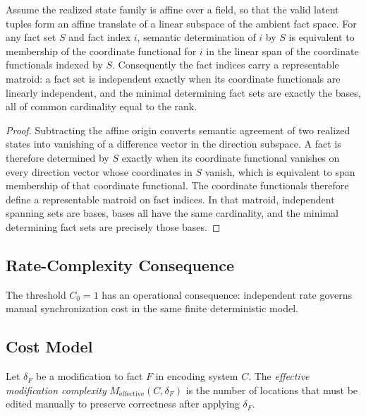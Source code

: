 \begin{theorem}\label{thm:affine-fact-matroid}
Assume the realized state family is affine over a field, so that the valid latent tuples form an affine translate of a linear subspace of the ambient fact space. For any fact set $S$ and fact index $i$, semantic determination of $i$ by $S$ is equivalent to membership of the coordinate functional for $i$ in the linear span of the coordinate functionals indexed by $S$. Consequently the fact indices carry a representable matroid: a fact set is independent exactly when its coordinate functionals are linearly independent, and the minimal determining fact sets are exactly the bases, all of common cardinality equal to the rank.
\end{theorem}

\begin{proof}
Subtracting the affine origin converts semantic agreement of two realized states into vanishing of a difference vector in the direction subspace. A fact is therefore determined by $S$ exactly when its coordinate functional vanishes on every direction vector whose coordinates in $S$ vanish, which is equivalent to span membership of that coordinate functional. The coordinate functionals therefore define a representable matroid on fact indices. In that matroid, independent spanning sets are bases, bases all have the same cardinality, and the minimal determining fact sets are precisely those bases.
\end{proof}

\subsection{Rate-Complexity Consequence}\label{sec:rate-complexity-consequence}

The threshold $C_0=1$ has an operational consequence: independent rate governs manual synchronization cost in the same finite deterministic model.

\subsection{Cost Model}\label{sec:cost-model}

\begin{definition}\label{def:cost-model}
Let $\delta_F$ be a modification to fact $F$ in encoding system $C$. The \emph{effective modification complexity} $M_{\mathrm{effective}}(C,\delta_F)$ is the number of locations that must be edited manually to preserve correctness after applying $\delta_F$.
\end{definition}


